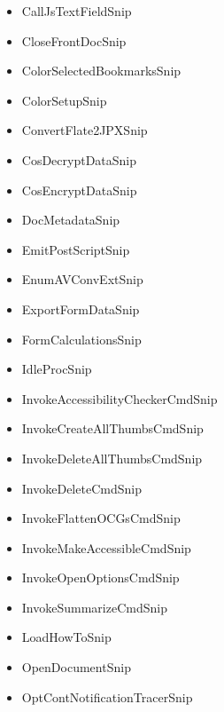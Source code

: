 \documentclass[letterpaper,12pt,english,openany,oneside]{sphinxmanual}
\begin{document}
\begin{itemize}
\item {} 
CallJsTextFieldSnip

\item {} 
CloseFrontDocSnip

\item {} 
ColorSelectedBookmarksSnip

\item {} 
ColorSetupSnip

\item {} 
ConvertFlate2JPXSnip

\item {} 
CosDecryptDataSnip

\item {} 
CosEncryptDataSnip

\item {} 
DocMetadataSnip

\item {} 
EmitPostScriptSnip

\item {} 
EnumAVConvExtSnip

\item {} 
ExportFormDataSnip

\item {} 
FormCalculationsSnip

\item {} 
IdleProcSnip

\item {} 
InvokeAccessibilityCheckerCmdSnip

\item {} 
InvokeCreateAllThumbsCmdSnip

\item {} 
InvokeDeleteAllThumbsCmdSnip

\item {} 
InvokeDeleteCmdSnip

\item {} 
InvokeFlattenOCGsCmdSnip

\item {} 
InvokeMakeAccessibleCmdSnip

\item {} 
InvokeOpenOptionsCmdSnip

\item {} 
InvokeSummarizeCmdSnip

\item {} 
LoadHowToSnip

\item {} 
OpenDocumentSnip

\item {} 
OptContNotificationTracerSnip


\end{itemize}
\end{document}

